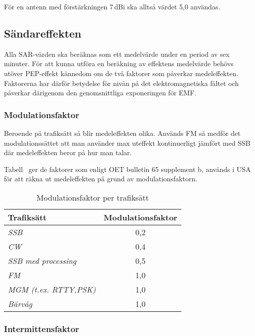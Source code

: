 För en antenn med förstärkningen 7\,dBi ska alltså värdet 5,0 användas.


\subsection{Sändareffekten}
Alla SAR-värden ska beräknas som ett medelvärde under en period av sex minuter.
För att kunna utföra en beräkning av effektens medelvärde behövs utöver
PEP-effekt kännedom om de två faktorer som påverkar medeleffekten.
Faktorerna har därför betydelse för nivån på det elektromagnetiska fältet och
påverkar därigenom den genomsnittliga exponeringen för EMF.

\subsubsection{Modulationsfaktor}

Beroende på trafiksätt så blir medeleffekten olika.
Används FM så medför det modulationssättet att man använder max uteffekt
kontinuerligt jämfört med SSB där medeleffekten beror på hur man talar.

Tabell~ ger de faktorer som enligt OET bulletin 65 supplement b,
\cite{OETbul65b} används i USA för att räkna ut medeleffekten på grund
av modulationsfaktorn.

\begin{table}[H]
  \begin{center}
    \begin{tabular}{lc}
	\textbf{Trafiksätt} & \textbf{Modulationsfaktor} \\ 
	\hline
	\emph{SSB} & 0,2 \\ 
	\emph{CW} & 0,4 \\ 
	\emph{SSB med processing} & 0,5 \\ 
	\emph{FM} & 1,0 \\ 
	\emph{MGM (t.ex. RTTY,PSK)} & 1,0 \\ 
	\emph{Bärvåg} & 1,0 \\ 
    \end{tabular}
    \caption{Modulationsfaktor per trafiksätt}
    \label{tab:modfakt}
  \end{center}
\end{table}

\subsubsection{Intermittensfaktor}


